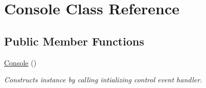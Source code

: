 \hypertarget{class_console}{}\section{Console Class Reference}
\label{class_console}
\subsection*{Public Member Functions}
\begin{DoxyCompactItemize}
\item 
\mbox{\label{class_console_aba16cfd9f0894eb1312b1bc1155b6646}} 
\mbox{\hyperlink{class_console_aba16cfd9f0894eb1312b1bc1155b6646}{Console}} ()
\begin{DoxyCompactList}\small\item\em Constructs instance by calling intializing control event handler. \end{DoxyCompactList}\end{DoxyCompactItemize}
